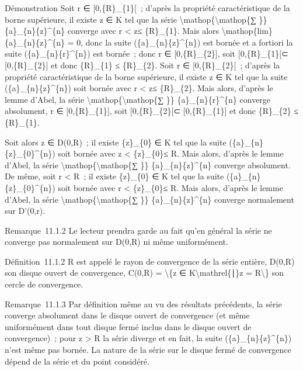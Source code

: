 \documentclass[]{article}
\begin{document}
Démonstration Soit r ∈ {[}0,\{R\}\_\{1\}{[}~; d'après la propriété
caractéristique de la borne supérieure, il existe z ∈ K tel que la série
\textbackslash{}mathop\{\textbackslash{}mathop\{∑ \}\}
\{a\}\_\{n\}\{z\}\^{}\{n\} converge avec r \textless{}
\textbar{}z\textbar{}≤ \{R\}\_\{1\}. Mais alors
\textbackslash{}mathop\{lim\}\{a\}\_\{n\}\{z\}\^{}\{n\} = 0, donc la
suite (\{a\}\_\{n\}\{z\}\^{}\{n\}) est bornée et a fortiori la suite
(\{a\}\_\{n\}\{r\}\^{}\{n\}) est bornée~; donc r ∈ {[}0,\{R\}\_\{2\}{]},
soit {[}0,\{R\}\_\{1\}{[}⊂ {[}0,\{R\}\_\{2\}{]} et donc \{R\}\_\{1\} ≤
\{R\}\_\{2\}. Soit r ∈ {[}0,\{R\}\_\{2\}{[}~; d'après la propriété
caractéristique de la borne supérieure, il existe z ∈ K tel que la suite
(\{a\}\_\{n\}\{z\}\^{}\{n\}) soit bornée avec r \textless{}
\textbar{}z\textbar{}≤ \{R\}\_\{2\}. Mais alors, d'après le lemme
d'Abel, la série \textbackslash{}mathop\{\textbackslash{}mathop\{∑ \}\}
\{a\}\_\{n\}\{r\}\^{}\{n\} converge absolument, r ∈
{[}0,\{R\}\_\{1\}{]}, soit {[}0,\{R\}\_\{2\}{[}⊂ {[}0,\{R\}\_\{1\}{]} et
donc \{R\}\_\{2\} ≤ \{R\}\_\{1\}.

Soit alors z ∈ D(0,R)~; il existe \{z\}\_\{0\} ∈ K tel que la suite
(\{a\}\_\{n\}\{z\}\_\{0\}\^{}\{n\}) soit bornée avec
\textbar{}z\textbar{} \textless{} \textbar{}\{z\}\_\{0\}\textbar{}≤ R.
Mais alors, d'après le lemme d'Abel, la série
\textbackslash{}mathop\{\textbackslash{}mathop\{∑ \}\}
\{a\}\_\{n\}\{z\}\^{}\{n\} converge absolument. De même, soit r
\textless{} R~; il existe \{z\}\_\{0\} ∈ K tel que la suite
(\{a\}\_\{n\}\{z\}\_\{0\}\^{}\{n\}) soit bornée avec r \textless{}
\textbar{}\{z\}\_\{0\}\textbar{}≤ R. Mais alors, d'après le lemme
d'Abel, la série \textbackslash{}mathop\{\textbackslash{}mathop\{∑ \}\}
\{a\}\_\{n\}\{z\}\^{}\{n\} converge normalement sur D'(0,r).

Remarque~11.1.2 Le lecteur prendra garde au fait qu'en général la série
ne converge pas normalement sur D(0,R) ni même uniformément.

Définition~11.1.2 R est appelé le rayon de convergence de la série
entière, D(0,R) son disque ouvert de convergence, C(0,R) =
\textbackslash{}\{z ∈ K\textbackslash{}mathrel\{∣\}\textbar{}z\textbar{}
= R\textbackslash{}\} son cercle de convergence.

Remarque~11.1.3 Par définition même au vu des résultats précédents, la
série converge absolument dans le disque ouvert de convergence (et même
uniformément dans tout disque fermé inclus dans le disque ouvert de
convergence)~; pour \textbar{}z\textbar{} \textgreater{} R la série
diverge et en fait, la suite (\{a\}\_\{n\}\{z\}\^{}\{n\}) n'est même pas
bornée. La nature de la série sur le disque fermé de convergence dépend
de la série et du point considéré.
\end{document}

